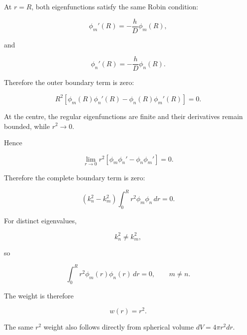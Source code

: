 \documentclass[11pt,a4paper]{article}
\begin{document}
At $r=R$, both eigenfunctions satisfy the same Robin condition:

\begin{equation}
\phi_m'(R)=-\frac{h}{D}\phi_m(R),
\tag{TRISO-SL-218}
\label{eq:triso-sl-218}
\end{equation}

and

\begin{equation}
\phi_n'(R)=-\frac{h}{D}\phi_n(R).
\tag{TRISO-SL-219}
\label{eq:triso-sl-219}
\end{equation}

Therefore the outer boundary term is zero:

\begin{equation}
R^2
[
\phi_m(R)\phi_n'(R)
-
\phi_n(R)\phi_m'(R)
]
=0.
\tag{TRISO-SL-220}
\label{eq:triso-sl-220}
\end{equation}

At the centre, the regular eigenfunctions are finite and their derivatives remain bounded, while $r^2\to0$.

Hence

\begin{equation}
\lim_{r\to0}
r^2
[
\phi_m\phi_n'
-
\phi_n\phi_m'
]
=0.
\tag{TRISO-SL-221}
\label{eq:triso-sl-221}
\end{equation}

Therefore the complete boundary term is zero:

\begin{equation}
(k_n^2-k_m^2)
\int_0^R
r^2\phi_m\phi_n\,dr
=
0.
\tag{TRISO-SL-222}
\label{eq:triso-sl-222}
\end{equation}

For distinct eigenvalues,

\begin{equation}
k_n^2\ne k_m^2,
\tag{TRISO-SL-223}
\label{eq:triso-sl-223}
\end{equation}

so

\begin{equation}
\boxed{
\int_0^R
r^2\phi_m(r)\phi_n(r)\,dr
=
0,
\qquad m\ne n.
}
\tag{TRISO-SL-224}
\label{eq:triso-sl-224}
\end{equation}

The weight is therefore

\begin{equation}
\boxed{
w(r)=r^2.
}
\tag{TRISO-SL-225}
\label{eq:triso-sl-225}
\end{equation}

The same $r^2$ weight also follows directly from spherical volume $dV=4\pi r^2dr$.
\end{document}
